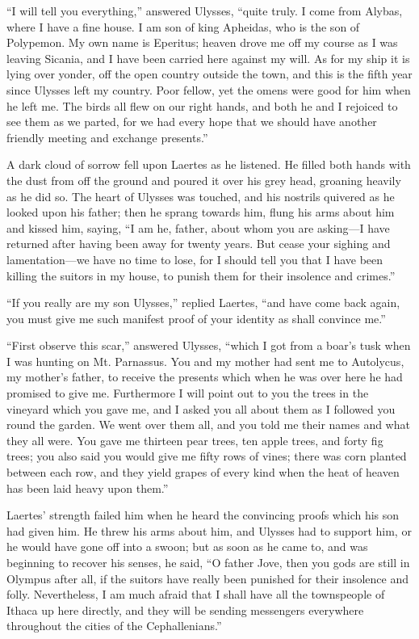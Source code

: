 “I will tell you everything,” answered Ulysses, “quite truly. I come from
Alybas, where I have a fine house. I am son of king Apheidas, who is the son of
Polypemon. My own name is Eperitus; heaven drove me off my course as I was
leaving Sicania, and I have been carried here against my will. As for my ship
it is lying over yonder, off the open country outside the town, and this is the
fifth year since Ulysses left my country. Poor fellow, yet the omens were good
for him when he left me. The birds all flew on our right hands, and both he and
I rejoiced to see them as we parted, for we had every hope that we should have
another friendly meeting and exchange presents.”

A dark cloud of sorrow fell upon Laertes as he listened. He filled both hands
with the dust from off the ground and poured it over his grey head, groaning
heavily as he did so. The heart of Ulysses was touched, and his nostrils
quivered as he looked upon his father; then he sprang towards him, flung his
arms about him and kissed him, saying, “I am he, father, about whom you are
asking—I have returned after having been away for twenty years. But cease your
sighing and lamentation—we have no time to lose, for I should tell you that I
have been killing the suitors in my house, to punish them for their insolence
and crimes.”

“If you really are my son Ulysses,” replied Laertes, “and have come back again,
you must give me such manifest proof of your identity as shall convince me.”

“First observe this scar,” answered Ulysses, “which I got from a boar’s tusk
when I was hunting on Mt. Parnassus. You and my mother had sent me to
Autolycus, my mother’s father, to receive the presents which when he was over
here he had promised to give me. Furthermore I will point out to you the trees
in the vineyard which you gave me, and I asked you all about them as I followed
you round the garden. We went over them all, and you told me their names and
what they all were. You gave me thirteen pear trees, ten apple trees, and forty
fig trees; you also said you would give me fifty rows of vines; there was corn
planted between each row, and they yield grapes of every kind when the heat of
heaven has been laid heavy upon them.”

Laertes’ strength failed him when he heard the convincing proofs which his son
had given him. He threw his arms about him, and Ulysses had to support him, or
he would have gone off into a swoon; but as soon as he came to, and was
beginning to recover his senses, he said, “O father Jove, then you gods are
still in Olympus after all, if the suitors have really been punished for their
insolence and folly. Nevertheless, I am much afraid that I shall have all the
townspeople of Ithaca up here directly, and they will be sending messengers
everywhere throughout the cities of the Cephallenians.”

